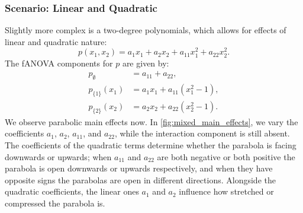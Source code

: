 \subsubsection{Scenario: Linear and Quadratic}
Slightly more complex is a two-degree polynomials, which allows for effects of linear and quadratic nature:
\[
p(x_1, x_2) = a_1 x_1 + a_2 x_2 + a_{11} x_1^2 + a_{22} x_2^2.
\]
The fANOVA components for $p$ are given by:
\begin{align*}
    p_{\emptyset} &= a_{11} + a_{22}, \\
    p_{\{1\}}(x_1) &= a_1 x_1 + a_{11}(x_1^2 - 1), \\
    p_{\{2\}}(x_2) &= a_2 x_2 + a_{22}(x_2^2 - 1).
\end{align*}
We observe parabolic main effects now. In \autoref{fig:mixed_main_effects}, we vary the coefficients $a_1$, $a_2$, $a_{11}$, and $a_{22}$, while the interaction component is still absent.
The coefficients of the quadratic terms determine whether the parabola is facing downwards or upwards; when $a_{11}$ and $a_{22}$ are both negative or both positive the parabola is open downwards or upwards respectively, and when they have opposite signs the parabolas are open in different directions. Alongside the quadratic coefficients, the linear ones $a_1$ and $a_2$ influence how stretched or compressed the parabola is.

